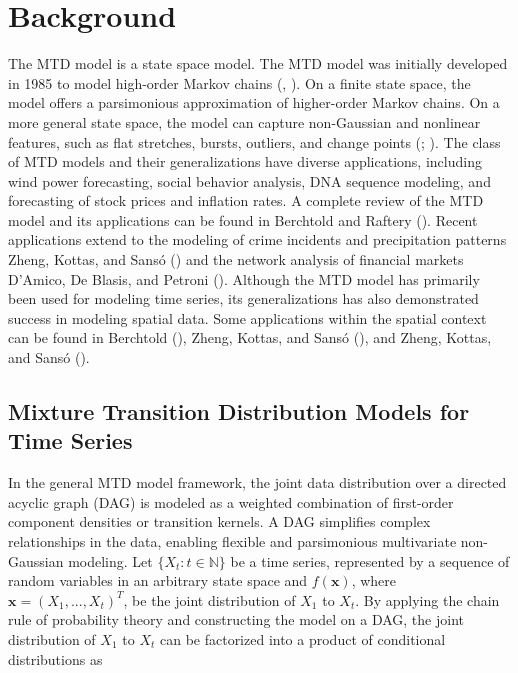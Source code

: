 \documentclass[
  letterpaper,
  double,
  12pt,
  1.0in]{beavtex}
\begin{document}
\chapter{Background}\label{sec-ch1-background}

The MTD model is a state space model. The MTD model was initially
developed in 1985 to model high-order Markov chains
(,
). On a finite state space, the
model offers a parsimonious approximation of higher-order Markov chains.
On a more general state space, the model can capture non-Gaussian and
nonlinear features, such as flat stretches, bursts, outliers, and change
points (;
). The class
of MTD models and their generalizations have diverse applications,
including wind power forecasting, social behavior analysis, DNA sequence
modeling, and forecasting of stock prices and inflation rates. A
complete review of the MTD model and its applications can be found in
Berchtold and Raftery ().
Recent applications extend to the modeling of crime incidents and
precipitation patterns Zheng, Kottas, and Sansó
() and the network analysis of
financial markets D'Amico, De Blasis, and Petroni
(). Although the MTD model has
primarily been used for modeling time series, its generalizations has
also demonstrated success in modeling spatial data. Some applications
within the spatial context can be found in Berchtold
(), Zheng, Kottas, and Sansó
(), and Zheng, Kottas, and Sansó
().

\section{Mixture Transition Distribution Models for Time
Series}\label{mixturetransitiondistributionmodels}

In the general MTD model framework, the joint data distribution over a
directed acyclic graph (DAG) is modeled as a weighted combination of
first-order component densities or transition kernels. A DAG simplifies
complex relationships in the data, enabling flexible and parsimonious
multivariate non-Gaussian modeling. Let \(\{ X_t: t \in \mathbb{N} \}\)
be a time series, represented by a sequence of random variables in an
arbitrary state space and \(f(\textbf{x})\), where
\(\textbf{x} = {(X_1,..., X_t)}^T\), be the joint distribution of
\(X_1\) to \(X_t\). By applying the chain rule of probability theory and
constructing the model on a DAG, the joint distribution of \(X_1\) to
\(X_t\) can be factorized into a product of conditional distributions as
\end{document}
